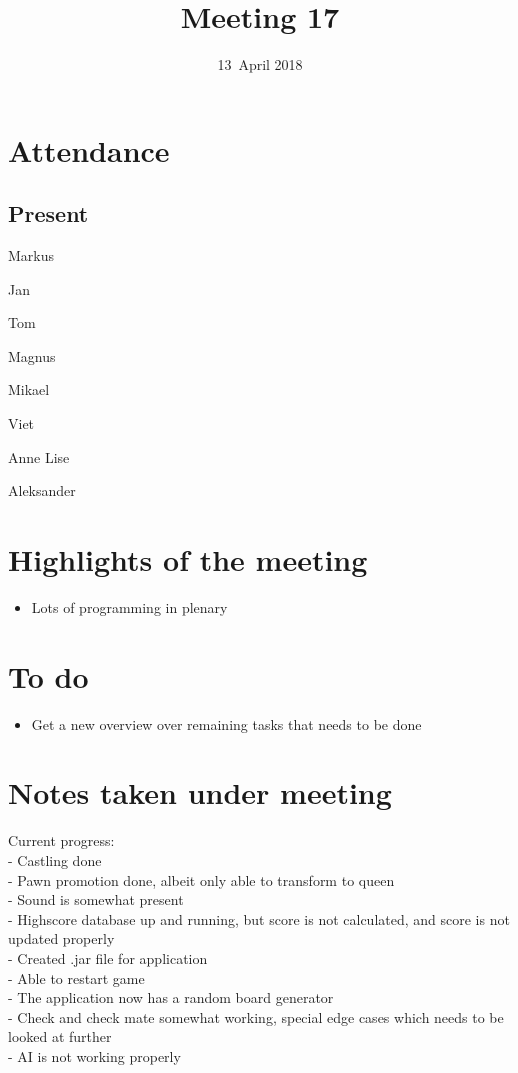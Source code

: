 \documentclass[letterpaper,11pt]{article}
\title{Meeting 17}
\date{13~April 2018}
\begin{document}
\maketitle
\section*{Attendance}
\subsection*{Present}
\begin{list}{}{}
	\item Markus
	\item Jan
	\item Tom
	\item Magnus
	\item Mikael
	\item Viet
	\item Anne Lise
	\item Aleksander
\end{list}

\newpage
\section*{Highlights of the meeting}
\begin{itemize}
	\item Lots of programming in plenary
\end{itemize}

\section*{To do}
\begin{itemize}
	\item Get a new overview over remaining tasks that needs to be done
\end{itemize}

\section*{Notes taken under meeting}
Current progress:\\
- Castling done\\
- Pawn promotion done, albeit only able to transform to queen\\
- Sound is somewhat present\\
- Highscore database up and running, but score is not calculated, and score is not updated properly\\
- Created .jar file for application\\
- Able to restart game\\
- The application now has a random board generator\\
- Check and check mate somewhat working, special edge cases which needs to be looked at further\\
- AI is not working properly\\
\end{document}
